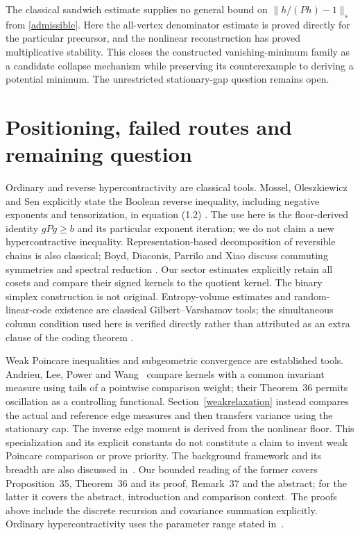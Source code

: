 \documentclass[11pt]{article}
\begin{document}
The classical sandwich estimate supplies no general bound on
$\|h/(Ph)-1\|_s$ from \eqref{admissible}. Here the all-vertex
denominator estimate is proved directly for the particular precursor,
and the nonlinear reconstruction has proved multiplicative stability.
This closes the constructed vanishing-minimum family as a candidate
collapse mechanism while preserving its counterexample to deriving a
potential minimum. The unrestricted stationary-gap question remains open.


\section{Positioning, failed routes and remaining question}
Ordinary and reverse hypercontractivity are classical tools. Mossel, Oleszkiewicz and Sen explicitly state the Boolean reverse inequality, including negative exponents and tensorization, in equation (1.2) \cite{mos}. The use here is the floor-derived identity $gPg\geq b$ and its particular exponent iteration; we do not claim a new hypercontractive inequality. Representation-based decomposition of reversible chains is also classical; Boyd, Diaconis, Parrilo and Xiao discuss commuting symmetries and spectral reduction \cite{boyd}. Our sector estimates explicitly retain all cosets and compare their signed kernels to the quotient kernel. The binary simplex construction is not original. Entropy-volume estimates and random-linear-code existence are classical Gilbert--Varshamov tools; the simultaneous column condition used here is verified directly rather than attributed as an extra clause of the coding theorem \cite{guruswami}.

Weak Poincare inequalities and subgeometric convergence are established tools.
Andrieu, Lee, Power and Wang~\cite{alpw2022} compare kernels with a common
invariant measure using tails of a pointwise comparison weight; their
Theorem~36 permits oscillation as a controlling functional. Section~\ref{weakrelaxation}
instead compares the actual and reference edge measures and then transfers
variance using the stationary cap. The inverse edge moment is derived from
the nonlinear floor. This specialization and its explicit constants do not
constitute a claim to invent weak Poincare comparison or prove priority.
The background framework and its breadth are also discussed in~\cite{alpw2023}.
Our bounded reading of the former covers Proposition~35, Theorem~36 and its
proof, Remark~37 and the abstract; for the latter it covers the abstract,
introduction and comparison context. The proofs above include the discrete
recursion and covariance summation explicitly. Ordinary hypercontractivity
uses the parameter range stated in~\cite{odonnelllecture}.
\end{document}
